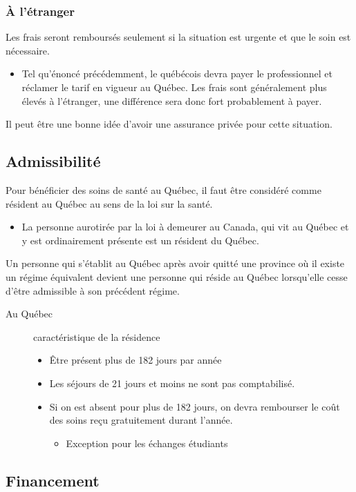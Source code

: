 \documentclass[10pt, french]{article}
\begin{document}
\begin{multicols*}{3}
	\subsubsection*{À l'étranger}
	Les frais seront remboursés seulement si la situation est urgente et que le soin est nécessaire.
	\begin{itemize}
	\item	Tel qu'énoncé précédemment, le québécois devra payer le professionnel et réclamer le tarif en vigueur au Québec. Les frais sont généralement plus élevés à l'étranger, une différence sera donc fort probablement à payer.
	\end{itemize}
	Il peut être une bonne idée d'avoir une assurance privée pour cette situation.


\subsection{Admissibilité}
Pour bénéficier des soins de santé au Québec, il faut être considéré comme résident au Québec au sens de la loi sur la santé.
	\begin{itemize}
	\item 	La personne aurotirée par la loi à demeurer au Canada, qui vit au Québec et y est ordinairement présente est un résident du Québec.
	\end{itemize}
Un personne qui s'établit au Québec après avoir quitté une province où il existe un régime équivalent devient une personne qui réside au Québec lorsqu'elle cesse d'être admissible à son précédent régime.
\begin{description}
\item[Au Québec] caractéristique de la résidence
	\begin{itemize}
	\item	Être présent plus de 182 jours par année
	\item	Les séjours de 21 jours et moins ne sont pas comptabilisé.
	\item	Si on est absent pour plus de 182 jours, on devra rembourser le coût des soins reçu gratuitement durant l'année.
		\begin{itemize}
		\item 	Exception pour les échanges étudiants
		\end{itemize}
	\end{itemize}
\end{description}


\subsection{Financement}

\end{multicols*}
\end{document}
